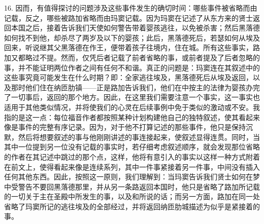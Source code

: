 16. 因而，有值得探讨的问题涉及这些事件发生的确切时间：哪些事件被省略而由记载，反之，哪些被路加省略而由玛窦记载。因为玛窦在记述了从东方来的贤士返回本国之后，接着告诉我们天使如何警告带着婴孩逃往，以免被杀害；然后黑落德如何找不到他，却杀尽了两岁及以下的婴孩；此后，黑落德死后，若瑟如何从埃及回来，听说继其父黑落德在作王，便带着孩子往境内，住在城。所有这些事实，路加又都略过不提。然而，仅凭后者记载了前者省略的事，或前者提及了后者忽略的事，并不能证明两位作者之间有任何不和谐。真正的问题是：玛窦连在其叙述中的这些事究竟可能发生在什么时期？即：全家逃往埃及，黑落德死后从埃及返回，以及那时他们住在纳匝肋镇——正是路加告诉我们，他们在中按主的法律为婴孩办完了一切事后，返回的那个地方。因此，在这里我们需要注意一个事实，这一事实也适用于其他类似情况，并将使我们的心灵在后续事例中免于类似的激动或不安。我指的是这一点：每位福音作者都按照某种计划构建他自己的独特叙述，使其看起来像是事件的完整有序记录。因为，对于他不打算记述的那些事件，他只是保持沉默，然后将想要叙述的事与他刚刚讲述的事连接起来，使叙述显得连贯。同时，当其中一位提到另一位没有记载的事实时，若仔细考虑叙述顺序，就会发现那位省略的作者在其记述中跳过的那个点，这样，他将有意引入的事实以这样一种方式附着在前文上，使得看起来像是连续系列，其中一件事紧接着另一件事，中间没有插入任何其他东西。因此，按照这一原则，我们理解到：当玛窦告诉我们贤士如何在梦中受警告不要回黑落德那里，并从另一条路返回本国时，他只是省略了路加所记载的一切关于主在圣殿中所发生的事，以及和所说的话；而另一方面，路加在同一处省略了玛窦所记的逃往埃及的全部经过，并将返回纳匝肋城描述为似乎是紧接着的事。\par

